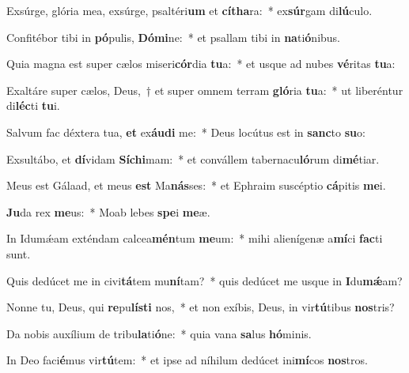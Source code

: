\item Exsúrge, glória mea, exsúrge, psaltéri\textbf{um} et \textbf{cí}\textbf{tha}ra:~* ex\textbf{súr}gam di\textbf{lú}culo.
\item Confitébor tibi in \textbf{pó}pulis, \textbf{Dó}\textbf{mi}ne:~* et psallam tibi in \textbf{na}ti\textbf{ó}nibus.
\item Quia magna est super cælos miseri\textbf{cór}dia \textbf{tu}a:~* et usque ad nubes \textbf{vé}ritas \textbf{tu}a:
\item Exaltáre super cælos, Deus,~† et super omnem terram \textbf{gló}ria \textbf{tu}a:~* ut liberéntur di\textbf{léc}ti \textbf{tu}i.
\item Salvum fac déxtera tua, \textbf{et} ex\textbf{áu}\textbf{di} me:~* Deus locútus est in \textbf{sanc}to \textbf{su}o:
\item Exsultábo, et \textbf{dí}vidam \textbf{Sí}\textbf{chi}mam:~* et convállem tabernacu\textbf{ló}rum di\textbf{mé}tiar.
\item Meus est Gálaad, et meus \textbf{est} Ma\textbf{nás}ses:~* et Ephraim suscéptio \textbf{cá}pitis \textbf{me}i.
\item \textbf{Ju}da rex \textbf{me}us:~* Moab lebes \textbf{spe}i \textbf{me}æ.
\item In Idumǽam exténdam calcea\textbf{mén}tum \textbf{me}um:~* mihi alienígenæ a\textbf{mí}ci \textbf{fac}ti sunt.
\item Quis dedúcet me in civi\textbf{tá}tem mu\textbf{ní}tam?~* quis dedúcet me usque in \textbf{I}du\textbf{mǽ}am?
\item Nonne tu, Deus, qui \textbf{re}pu\textbf{lís}\textbf{ti} nos,~* et non exíbis, Deus, in vir\textbf{tú}tibus \textbf{nos}tris?
\item Da nobis auxílium de tribu\textbf{la}ti\textbf{ó}ne:~* quia vana \textbf{sa}lus \textbf{hó}minis.
\item In Deo faci\textbf{é}mus vir\textbf{tú}tem:~* et ipse ad níhilum dedúcet ini\textbf{mí}cos \textbf{nos}tros.
